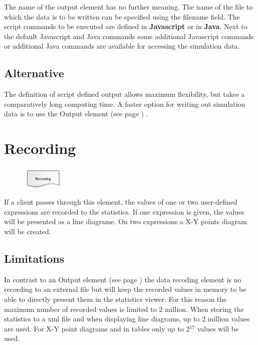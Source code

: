 The name of the output element has no further meaning. The name of the file to which the data is to be written
can be specified using the filename field. The script commands to be executed are defined in \textbf{Javascript}
or in \textbf{Java}. Next to the default Javascript and Java commands some
additional Javascript commands or additional Java commands 
are available for accessing the simulation data.

\subsection*{Alternative}

The definition of script defined output allows maximum flexibility, but takes a comparatively long
computing time. A faster option for writing out simulation data is to use the
Output element (see page \pageref{ref:ModelElementOutput}) .


\section{Recording}
\label{ref:ModelElementRecord}

\begin{figure}
\vspace{-22pt}
\includegraphics[width=2cm]{imageModelElementRecord.png}
\vspace{-22pt}
\end{figure}

If a client passes through this element, the values of one or two user-defined expressions
are recorded to the statistics. If one expression is given, the values will be presented
as a line diagrame. On two expressions a X-Y points diagram will be created.

\subsection*{Limitations}

In contrast to an Output element (see page \pageref{ref:ModelElementOutput}) the data recoding element
is no recording to an external file but will keep the recorded values in memory to be able to
directly present them in the statistics viewer. For this reason the maximum number of recorded
values is limited to 2 million. When storing the statistics to a xml file and when displaying
line diagrams, up to 2 million values are used. For X-Y point diagrams and in tables only up to
2$^{17}$ values will be used.

